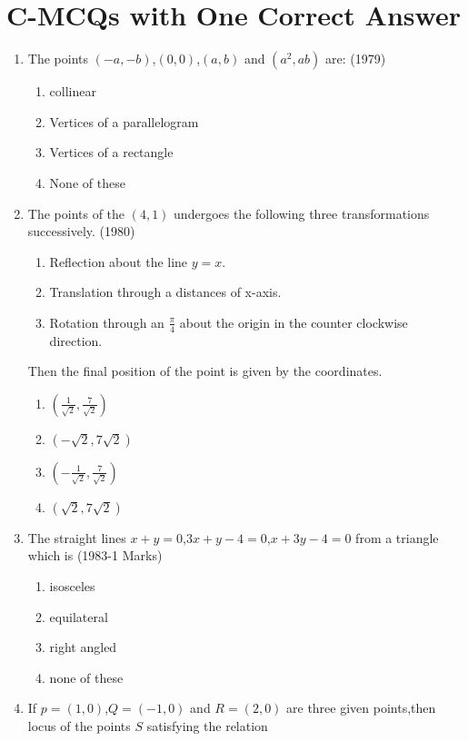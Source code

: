 \documentclass[journal,12pt,twocolumn]{IEEEtran}
\theoremstyle{remark}
\begin{document}
\section {C-MCQs with One Correct Answer}
\begin{enumerate}
    \item The points $(-a,-b)$,$(0,0)$,$(a,b)$ and $(a^2,ab)$ are:
    \hfill(1979)
    \begin{enumerate}
        \item collinear
        \item Vertices of a parallelogram
        \item Vertices of a rectangle 
        \item None of these
    \end{enumerate}
    \item The points of the $(4,1)$ undergoes the following three transformations successively.
    \hfill(1980)
    \begin{enumerate}
        \item Reflection about the line $y=x.$
        \item Translation through a distances of x-axis.
        \item Rotation through an $\frac{\pi}{4}$ about the origin in the counter clockwise direction.
    \end{enumerate}
    Then the final position of the point is given by the coordinates.
    \begin{enumerate}
        \item $\left(\frac{1}{\sqrt{2}},\frac{7}{\sqrt{2}} \right)$
        \item $(-\sqrt{2},7\sqrt{2})$
        \item $\left(-\frac{1}{\sqrt{2}},\frac{7}{\sqrt{2}} \right)$
        \item $(\sqrt{2},7\sqrt{2})$
    \end{enumerate}
    \item The straight lines $x+y=0$,$3x+y-4=0$,$x+3y-4=0$ from a triangle which is 
    \hfill(1983-1 Marks)
    \begin{enumerate}
        \item isosceles
        \item equilateral 
        \item right angled
        \item none of these
    \end{enumerate}
    \item If $p=(1,0)$,$Q=(-1,0)$ and $R=(2,0)$ are three given points,then locus of the points $S$ satisfying the relation\\

\end{enumerate}
\end{document}
